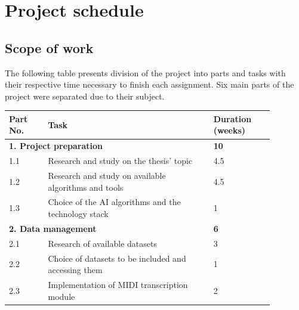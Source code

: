 \documentclass{article}
\begin{document}
\section{Project schedule}
\subsection{Scope of work}
The following table presents division of the project into parts and tasks with their respective time necessary to finish each assignment. Six main parts of the project were separated due to their subject.

\begin{center}
    \begin{tabular}{ |p{0.13\linewidth}|p{0.55\linewidth}|p{0.20\linewidth}| }
        \hline
        Part No.                                                                & Task                                                 & Duration (weeks) \\
        \hline
        \multicolumn{2}{|l|}{\textbf{1. Project preparation}}                   & \textbf{10}                                                             \\
        \hline
        1.1                                                                     & Research and study on the thesis' topic              & 4.5              \\
        \hline
        1.2                                                                     & Research and study on available algorithms and tools & 4.5              \\
        \hline
        1.3                                                                     & Choice of the AI algorithms and the technology stack & 1                \\
        \hline
        \multicolumn{2}{|l|}{\textbf{2. Data management}}                       & \textbf{6}                                                              \\
        \hline
        2.1                                                                     & Research of available datasets                       & 3                \\
        \hline
        2.2                                                                     & Choice of datasets to be included and accessing them & 1                \\
        \hline
        2.3                                                                     & Implementation of MIDI transcription module          & 2                \\

\end{tabular}
\end{center}
\end{document}
